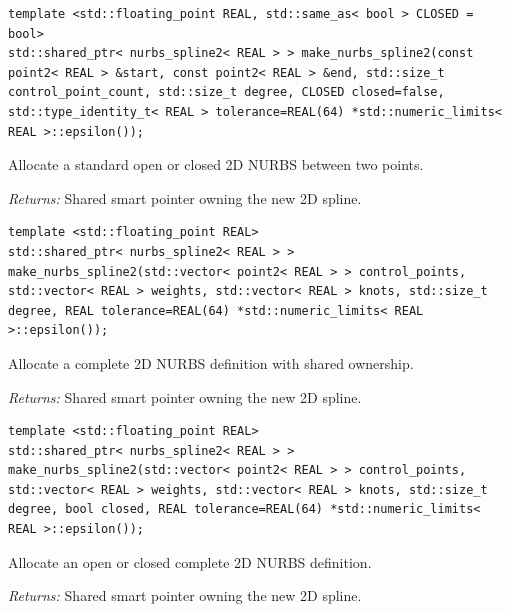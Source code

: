 \par\noindent\begin{minipage}{\linewidth}
\begin{lstlisting}[style=apireference]
template <std::floating_point REAL, std::same_as< bool > CLOSED = bool>
std::shared_ptr< nurbs_spline2< REAL > > make_nurbs_spline2(const point2< REAL > &start, const point2< REAL > &end, std::size_t control_point_count, std::size_t degree, CLOSED closed=false, std::type_identity_t< REAL > tolerance=REAL(64) *std::numeric_limits< REAL >::epsilon());
\end{lstlisting}
{\footnotesize Allocate a standard open or closed 2D NURBS between two points.\par}
{\footnotesize\textit{Returns:} Shared smart pointer owning the new 2D spline.\par}
\end{minipage}\par\vspace{1pt}
\par\noindent\begin{minipage}{\linewidth}
\begin{lstlisting}[style=apireference]
template <std::floating_point REAL>
std::shared_ptr< nurbs_spline2< REAL > > make_nurbs_spline2(std::vector< point2< REAL > > control_points, std::vector< REAL > weights, std::vector< REAL > knots, std::size_t degree, REAL tolerance=REAL(64) *std::numeric_limits< REAL >::epsilon());
\end{lstlisting}
{\footnotesize Allocate a complete 2D NURBS definition with shared ownership.\par}
{\footnotesize\textit{Returns:} Shared smart pointer owning the new 2D spline.\par}
\end{minipage}\par\vspace{1pt}
\par\noindent\begin{minipage}{\linewidth}
\begin{lstlisting}[style=apireference]
template <std::floating_point REAL>
std::shared_ptr< nurbs_spline2< REAL > > make_nurbs_spline2(std::vector< point2< REAL > > control_points, std::vector< REAL > weights, std::vector< REAL > knots, std::size_t degree, bool closed, REAL tolerance=REAL(64) *std::numeric_limits< REAL >::epsilon());
\end{lstlisting}
{\footnotesize Allocate an open or closed complete 2D NURBS definition.\par}
{\footnotesize\textit{Returns:} Shared smart pointer owning the new 2D spline.\par}
\end{minipage}\par\vspace{1pt}

